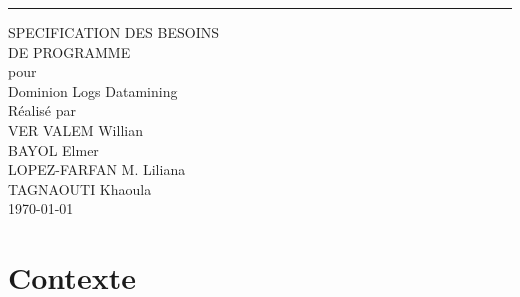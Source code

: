 \documentclass{scrreprt}
\date{}
\begin{document}
\begin{flushright}
    \rule{16cm}{5pt}\vskip1cm
    \begin{bfseries}
        \Huge{SPECIFICATION DES BESOINS\\ DE PROGRAMME }\\
        \vspace{1.9cm}
        pour\\
        \vspace{1.9cm}
        Dominion Logs Datamining\\
        \vspace{1.9cm}
        Réalisé par \\ VER VALEM Willian \\ BAYOL Elmer \\ LOPEZ-FARFAN M. Liliana
        \\ TAGNAOUTI Khaoula\\
        \vspace{1.9cm}
        \today\\
    \end{bfseries}
\end{flushright}

\tableofcontents




\chapter{Contexte}
\end{document}
